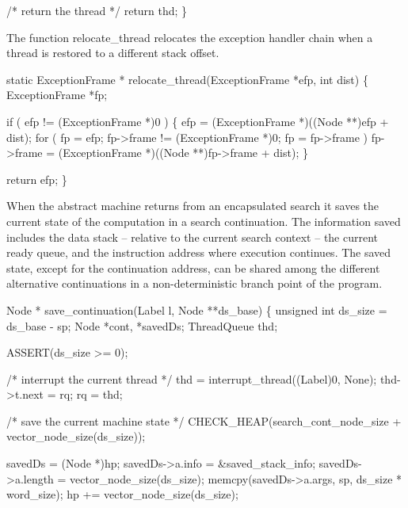     /* return the thread */
    return thd;
\}

\nwendcode{}\nwdocspar
The function {\Tt{}relocate{\_}thread\nwendquote} relocates the exception handler chain
when a thread is restored to a different stack offset.

\nwenddocs{}\plusendmoddef\nwstartdeflinemarkup{}\nwenddeflinemarkup
static ExceptionFrame *
relocate_thread(ExceptionFrame *efp, int dist)
\{
    ExceptionFrame *fp;

    if ( efp != (ExceptionFrame *)0 )
    \{
        efp = (ExceptionFrame *)((Node **)efp + dist);
        for ( fp = efp; fp->frame != (ExceptionFrame *)0; fp = fp->frame )
            fp->frame = (ExceptionFrame *)((Node **)fp->frame + dist);
    \}

    return efp;
\}

\nwendcode{}\nwdocspar
When the abstract machine returns from an encapsulated search it
saves the current state of the computation in a search
continuation. The information saved includes the data stack --
relative to the current search context -- the current ready queue, and
the instruction address where execution continues. The saved state,
except for the continuation address, can be shared among the different
alternative continuations in a non-deterministic branch point of the
program.

\nwenddocs{}\plusendmoddef\nwstartdeflinemarkup{}\nwenddeflinemarkup
Node *
save_continuation(Label l, Node **ds_base)
\{
    unsigned int ds_size = ds_base - sp;
    Node         *cont, *savedDs;
    ThreadQueue  thd;

    ASSERT(ds_size >= 0);

    /* interrupt the current thread */
    thd         = interrupt_thread((Label)0, None);
    thd->t.next = rq;
    rq          = thd;

    /* save the current machine state */
    CHECK_HEAP(search_cont_node_size + vector_node_size(ds_size));

    savedDs           = (Node *)hp;
    savedDs->a.info   = &saved_stack_info;
    savedDs->a.length = vector_node_size(ds_size);
    memcpy(savedDs->a.args, sp, ds_size * word_size);
    hp               += vector_node_size(ds_size);

